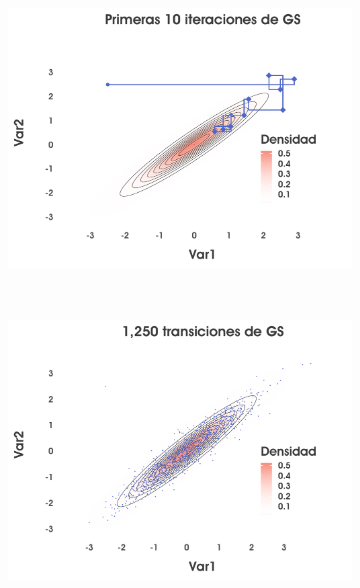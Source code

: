 \begin{figure}
    \centering
    \begin{subfigure}{0.31\textwidth}
        \includegraphics[width=\textwidth]{Figs/Bayes/Ejemplo_GS_Compara1}
    \end{subfigure}
    ~
    \begin{subfigure}{0.31\textwidth}
        \includegraphics[width=\textwidth]{Figs/Bayes/Ejemplo_GS_Compara2}
    \end{subfigure}
    ~
    \begin{subfigure}{0.31\textwidth}

\end{subfigure}
\end{figure}
